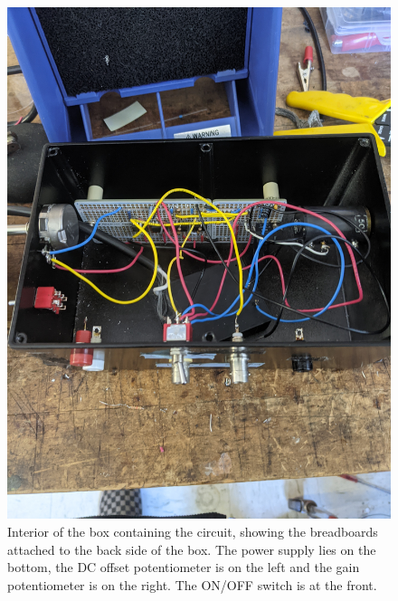 \documentclass{article}
\begin{document}
\begin{figure}
\centering
\includegraphics[width=\textwidth,angle=-90,origin=c]{Figures/InsideCircuit.jpg}
\caption{Interior of the box containing the circuit, showing the breadboards attached to the back side of the box. The power supply lies on the bottom, the DC offset potentiometer is on the left and the gain potentiometer is on the right. The ON/OFF switch is at the front.}
\label{inside}
\end{figure}
\end{document}
